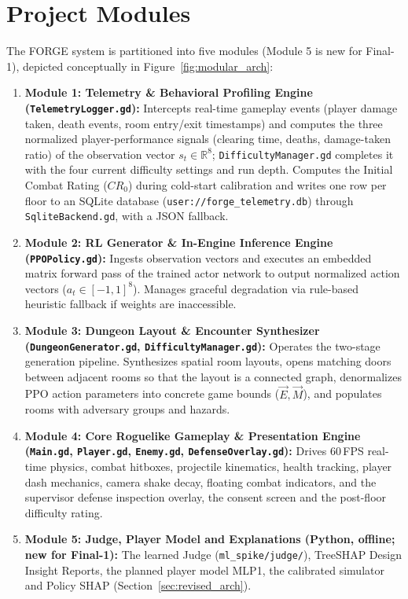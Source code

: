 \section{Project Modules}
The FORGE system is partitioned into five modules (Module 5 is new for Final-1), depicted conceptually in Figure~\ref{fig:modular_arch}:
\begin{enumerate}
    \item \textbf{Module 1: Telemetry \& Behavioral Profiling Engine (\texttt{TelemetryLogger.gd}):} Intercepts real-time gameplay events (player damage taken, death events, room entry/exit timestamps) and computes the three normalized player-performance signals (clearing time, deaths, damage-taken ratio) of the observation vector $s_t \in \mathbb{R}^8$; \texttt{DifficultyManager.gd} completes it with the four current difficulty settings and run depth. Computes the Initial Combat Rating ($CR_0$) during cold-start calibration and writes one row per floor to an SQLite database (\texttt{user://forge\_telemetry.db}) through \texttt{SqliteBackend.gd}, with a JSON fallback.
    \item \textbf{Module 2: RL Generator \& In-Engine Inference Engine (\texttt{PPOPolicy.gd}):} Ingests observation vectors and executes an embedded matrix forward pass of the trained actor network to output normalized action vectors ($a_t \in [-1, 1]^8$). Manages graceful degradation via rule-based heuristic fallback if weights are inaccessible.
    \item \textbf{Module 3: Dungeon Layout \& Encounter Synthesizer (\texttt{DungeonGenerator.gd}, \texttt{DifficultyManager.gd}):} Operates the two-stage generation pipeline. Synthesizes spatial room layouts, opens matching doors between adjacent rooms so that the layout is a connected graph, denormalizes PPO action parameters into concrete game bounds ($\vec{E}, \vec{M}$), and populates rooms with adversary groups and hazards.
    \item \textbf{Module 4: Core Roguelike Gameplay \& Presentation Engine (\texttt{Main.gd}, \texttt{Player.gd}, \texttt{Enemy.gd}, \texttt{DefenseOverlay.gd}):} Drives 60\,FPS real-time physics, combat hitboxes, projectile kinematics, health tracking, player dash mechanics, camera shake decay, floating combat indicators, and the supervisor defense inspection overlay, the consent screen and the post-floor difficulty rating.
    \item \textbf{Module 5: Judge, Player Model and Explanations (Python, offline; new for Final-1):} The learned Judge (\texttt{ml\_spike/judge/}), TreeSHAP Design Insight Reports, the planned player model MLP1, the calibrated simulator and Policy SHAP (Section~\ref{sec:revised_arch}).
\end{enumerate}

